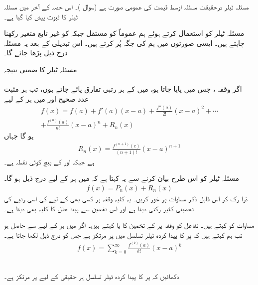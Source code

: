 مسئلہ ٹیلر درحقیقت مسئلہ اوسط قیمت کی عمومی صورت ہے (سوال )۔ 
 اس حصہ کے آخر میں مسئلہ ٹیلر کا ثبوت پیش کیا گیا ہے۔

مسئلہ ٹیلر کو استعمال کرتے ہوئے ہم عموماً  کو مستقل جبکہ  کو غیر تابع متغیر رکھنا چاہتے ہیں۔ ایسی صورتوں میں ہم  کی جگہ  پُر کرتے ہیں۔ اس تبدیلی کے بعد یہ مسئلہ درج ذیل پڑھا جائے گا۔

 مسئلہ ٹیلر کا ضمنی نتیجہ\\
\\
اگر وقفہ ، جس میں  پایا جاتا ہو، میں  کے ہر رتبی تفارق پائے جاتے ہوں، تب ہر مثبت عدد صحیح  اور  میں ہر  کے لیے
\begin{multline}\label{مساوات_تسلسل_ٹیلر_ضمنی_نتیجہ_الف}
f(x)=f(a)+f'(a)(x-a)+\frac{f''(a)}{2!}(x-a)^2+\cdots\\
+\frac{f^{(n)}(a)}{n!}(x-a)^n+R_n(x)
\end{multline}
ہو گا جہاں 
\begin{align}\label{مساوات_تسلسل_ٹیلر_ضمنی_نتیجہ_ب}
R_n(x)=\frac{f^{(n+1)}(c)}{(n+1)!}(x-a)^{n+1}
\end{align}
ہے جبکہ  اور  کے بیچ  کوئی نقطہ ہے۔

مسئلہ ٹیلر کو اس طرح بیان کرنے سے یہ کہتا ہے کہ  میں ہر  کے لیے درج ذیل ہو گا۔
\begin{align*}
f(x)=P_n(x)+R_n(x)
\end{align*}
ذرا  رک کر اس قابل ذکر مساوات پر غور کریں۔ یہ کلیہ وقفہ  پر کسی بھی  کے لیے  کی اسی رتبے کی تخمینی کثیر رکنی دیتا ہے اور اس تخمین سے پیدا خلل کا کلیہ بھی دیتا ہے۔ 

مساوات  کو  کہتے ہیں۔ تفاعل  کو وقفہ  پر  کے  تخمین  کا  یا  کہتے ہیں۔ اگر  میں  ہر  کے لیے   سے  حاصل ہو تب ہم کہتے ہیں کہ  پر  کا پیدا کردہ ٹیلر تسلسل   میں   پر مرتکز ہے جس کو درج ذیل لکھا جاتا ہے۔
\begin{align*}
f(x)=\sum_{k=0}^{\infty}\frac{f^{(k)}(a)}{k!}(x-a)^k
\end{align*}

 \\
دکھائیں کہ   پر  کا پیدا کردہ ٹیلر تسلسل ہر حقیقی  کے لیے  پر مرتکز ہے۔


